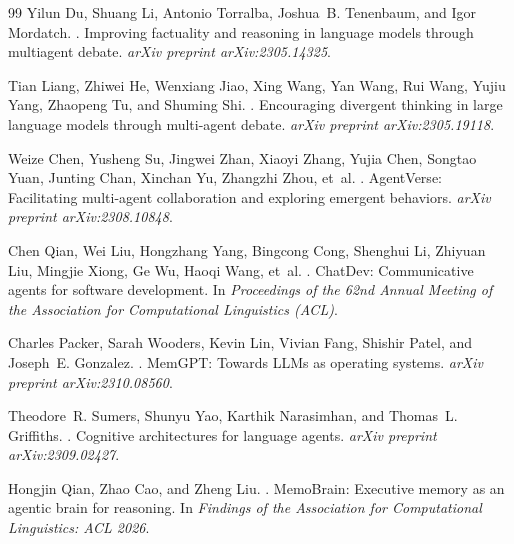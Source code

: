 \begin{thebibliography}{99}
Yilun Du, Shuang Li, Antonio Torralba, Joshua~B. Tenenbaum, and Igor
Mordatch.
.
\newblock Improving factuality and reasoning in language models through
multiagent debate.
\newblock \emph{arXiv preprint arXiv:2305.14325}.

Tian Liang, Zhiwei He, Wenxiang Jiao, Xing Wang, Yan Wang, Rui Wang,
Yujiu Yang, Zhaopeng Tu, and Shuming Shi.
.
\newblock Encouraging divergent thinking in large language models through
multi-agent debate.
\newblock \emph{arXiv preprint arXiv:2305.19118}.

Weize Chen, Yusheng Su, Jingwei Zhan, Xiaoyi Zhang, Yujia Chen, Songtao
Yuan, Junting Chan, Xinchan Yu, Zhangzhi Zhou, et~al.
.
\newblock AgentVerse: Facilitating multi-agent collaboration and exploring
emergent behaviors.
\newblock \emph{arXiv preprint arXiv:2308.10848}.

Chen Qian, Wei Liu, Hongzhang Yang, Bingcong Cong, Shenghui Li, Zhiyuan
Liu, Mingjie Xiong, Ge Wu, Haoqi Wang, et~al.
.
\newblock ChatDev: Communicative agents for software development.
\newblock In \emph{Proceedings of the 62nd Annual Meeting of the
Association for Computational Linguistics (ACL)}.

Charles Packer, Sarah Wooders, Kevin Lin, Vivian Fang, Shishir Patel,
and Joseph~E. Gonzalez.
.
\newblock MemGPT: Towards LLMs as operating systems.
\newblock \emph{arXiv preprint arXiv:2310.08560}.

Theodore~R. Sumers, Shunyu Yao, Karthik Narasimhan, and Thomas~L.
Griffiths.
.
\newblock Cognitive architectures for language agents.
\newblock \emph{arXiv preprint arXiv:2309.02427}.

Hongjin Qian, Zhao Cao, and Zheng Liu.
.
\newblock MemoBrain: Executive memory as an agentic brain for reasoning.
\newblock In \emph{Findings of the Association for Computational
Linguistics: ACL 2026}.


\end{thebibliography}
